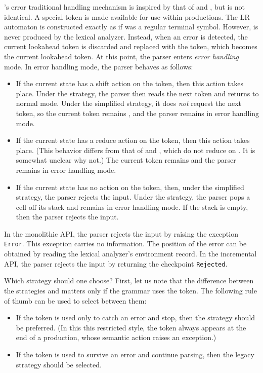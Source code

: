 \documentclass[onecolumn,11pt,nocopyrightspace,preprint]{sigplanconf}
\begin{document}
\menhir's error traditional handling mechanism is inspired by that of \yacc and
\ocamlyacc, but is not identical. A special \error token is made available
for use within productions. The LR automaton is constructed exactly as if
\error was a regular terminal symbol. However, \error is never produced
by the lexical analyzer. Instead, when an error is detected, the current
lookahead token is discarded and replaced with the \error token, which becomes
the current lookahead token. At this point, the parser enters \emph{error
handling} mode.
%
In error handling mode, the parser behaves as follows:
\begin{itemize}
\item If the current state has a shift action on the \error token, then this
  action takes place. Under the \legacy strategy, the parser then
  reads the next token and returns to normal mode. Under the
  simplified strategy, it does \emph{not} request the next token, so
  the current token remains \error, and the parser remains in error handling
  mode.
\item If the current state has a reduce action on the \error token, then this
  action takes place. (This behavior differs from that of \yacc and
  \ocamlyacc, which do not reduce on \error. It is somewhat unclear why not.)
  The current token remains \error and the parser remains in error handling
  mode.
\item If the current state has no action on the \error token, then, under the
  simplified strategy, the parser rejects the input. Under the
  \legacy strategy, the parser pops a cell off its stack and remains
  in error handling mode. If the stack is empty, then the parser rejects the
  input.
\end{itemize}

In the monolithic API, the parser rejects the input by raising the exception
\texttt{Error}. This exception carries no information. The position of the
error can be obtained by reading the lexical analyzer's environment record. In
the incremental API, the parser rejects the input by returning the checkpoint
\texttt{Rejected}.

Which strategy should one choose? First, let us note that the difference
between the strategies \legacy and \simplified matters only if the grammar
uses the \error token. The following rule of thumb can be used to select
between them:
\begin{itemize}
\item If the \error token is used only to catch an error and stop, then the
  \simplified strategy should be preferred. (In this this restricted style,
  the \error token always appears at the end of a production, whose semantic
  action raises an exception.)
\item If the \error token is used to survive an error and continue parsing,
  then the legacy strategy should be selected.
\end{itemize}
\end{document}
